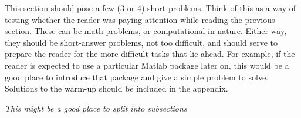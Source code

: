 This section should pose a few (3 or 4) short problems. Think of this as a way of testing whether the reader was paying attention while reading the previous section. These can be math problems, or computational in nature. Either way, they should be short-answer problems, not too difficult, and should serve to prepare the reader for the more difficult tasks that lie ahead. For example, if the reader is expected to use a particular Matlab package later on, this would be a good place to introduce that package and give a simple problem to solve. Solutions to the warm-up should be included in the appendix.

\textit{This might be a good place to split into subsections}